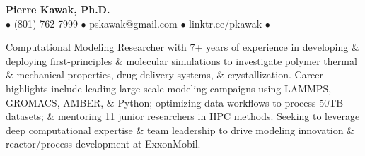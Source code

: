 \begin{center}
  {\LARGE \textbf{Pierre Kawak, Ph.D.} }\\[1ex]
  $\bullet$ (801) 762-7999 $\bullet$ pskawak@gmail.com $\bullet$ linktr.ee/pkawak $\bullet$ \\
\end{center}
\vspace{-0.25cm}
Computational Modeling Researcher with 7+ years of experience in developing \& deploying first-principles \& molecular simulations to investigate polymer thermal \& mechanical properties, drug delivery systems, \& crystallization.
Career highlights include leading large-scale modeling campaigns using LAMMPS, GROMACS, AMBER, \& Python; optimizing data workflows to process 50TB+ datasets; \& mentoring 11 junior researchers in HPC methods.
Seeking to leverage deep computational expertise \& team leadership to drive modeling innovation \& reactor/process development at ExxonMobil.
\vspace{-1.2\baselineskip}
